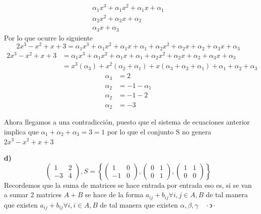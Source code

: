 \documentclass[letterpaper]{article}
\newcommand{\tq}{ \quad \cdot  \backepsilon \cdot \quad }
\renewcommand{\*}{\cdot}
\theoremstyle{definition}
\begin{document}
	\begin{align*}
		\alpha_1 x^3 + \alpha_1 x^2 + \alpha_1 x + \alpha_1 	\\
		\alpha_2 x^2 + \alpha_2 x + \alpha_2 \\
		\alpha_3 x + \alpha_3 
	\end{align*}
Por lo que ocurre lo siguiente
\[ 2x^3 - x^2 + x + 3 = \alpha_1 x^3 + \alpha_1 x^2 + \alpha_1 x + \alpha_1 + \alpha_2 x^2 + \alpha_2 x + \alpha_2 +\alpha_3 x + \alpha_3  \]
	\begin{align*}
		2x^3 - x^2 + x + 3 &= \alpha_1 x^3 + \alpha_1 x^2 + \alpha_1 x + \alpha_1 + \alpha_2 x^2 + \alpha_2 x + \alpha_2 +\alpha_3 x + \alpha_3 \\
		 &= x^3 (\alpha_3)  + x^2 (\alpha_2 + \alpha_1) + x(\alpha_3 + \alpha_2 + \alpha_1) + \alpha_1 + \alpha_2 + \alpha_3
	 \end{align*}
	\begin{align*}
		\alpha_3 &=  2\\
		\alpha_2 &= -1 - \alpha_1 \\
		\alpha_2 &= -1 - 2\\
		\alpha_2 &= -3
	\end{align*}

Ahora llegamos a una contradicción, puesto que el sistema de ecuaciones anterior implica que $\alpha_1 + \alpha_2 + \alpha_3 = 3 = 1$ por lo que el conjunto S no genera $ 2x^3 - x^2 + x + 3$

\textbf{d)} $$ \begin{pmatrix} 1 & 2 \\ -3 & 4 \end{pmatrix},  S =  \left\lbrace \begin{pmatrix} 1 & 0 \\ -1 & 0 \end{pmatrix} , \begin{pmatrix} 0 & 1 \\ 0 &1 \end{pmatrix} , \begin{pmatrix} 1 & 1 \\ 0 &0 \end{pmatrix} \right\rbrace$$
Recordemos que la suma de matrices se hace entrada por entrada eso es, si se van a sumar 2 matrices $A + B$ se hace de la forma $a_{ij} + b_{ij}  \forall i,j \in A,B$ de tal manera que existen  $a_{ij} + b_{ij}  \forall i,i \in A,B$ de tal manera que existen $\alpha, \beta, \gamma \tq $
\end{document}
